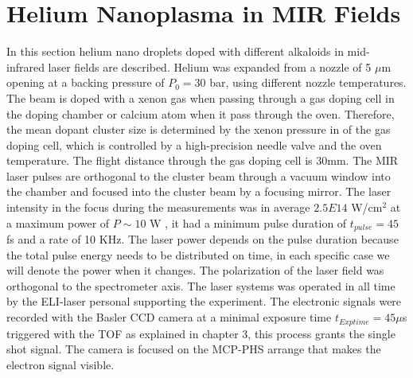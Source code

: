 
\section{Helium Nanoplasma in MIR Fields }
 
In this section helium nano droplets doped with different alkaloids  in mid-infrared laser fields are described. Helium was expanded from a nozzle of 5 $\mu$m opening at a backing pressure of $P_{0}=30$ bar, using different nozzle temperatures. The beam is doped with a xenon gas when passing through a gas doping cell in the doping chamber or calcium atom when it pass through the oven. Therefore, the mean dopant cluster size is determined by the xenon pressure in of the gas doping cell, which is controlled by a high-precision needle valve and the oven temperature. The flight distance through the gas doping cell is $30 $mm. The MIR laser pulses are orthogonal to the cluster beam through a vacuum window into the chamber and focused into the cluster beam by a focusing mirror.
The laser intensity in the focus during the measurements was in average $2.5E14$ W/cm$^{2}$ at a maximum power of $P\sim 10$ W , it had a minimum pulse duration of $t_{pulse}=45$ fs and a rate of 10 KHz. The laser power depends on the pulse duration because the total pulse energy needs to be distributed on time, in each specific case we will denote the power when it changes. The polarization of the laser field was orthogonal to the spectrometer axis. The laser systems was operated in all time by the ELI-laser personal supporting the experiment. The electronic signals were recorded with the Basler CCD camera at a minimal exposure time $t_{Exp time}=45 \mu$s triggered with the TOF as explained in chapter 3, this process grants the single shot signal. The camera is focused on the MCP-PHS arrange that makes the electron signal visible. 

